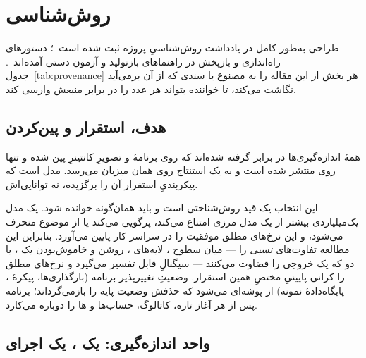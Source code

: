 \section{روش‌شناسی}
\label{sec:methodology}

طراحی به‌طور کامل در یادداشت روش‌شناسیِ پروژه ثبت شده
است~\cite{pwnzzdocsmeth}؛ دستورهای راه‌اندازی و بازپخش در راهنماهای
بازتولید و آزمون دستی
آمده‌اند~\cite{pwnzzdocsrepro,pwnzzdocsmanual}. جدول~\ref{tab:provenance}
هر بخش از این مقاله را به مصنوع یا سندی که از آن برمی‌آید نگاشت می‌کند، تا
خواننده بتواند هر عدد را در برابر منبعش وارسی کند.

\subsection{هدف، استقرار و پین‌کردن}
\label{sec:method:target}

همهٔ اندازه‌گیری‌ها در برابر  گرفته شده‌اند که روی
 برنامهٔ  و  تصویرِ کانتینرِ
 پین شده و تنها روی
 منتشر شده است و به یک 
استنتاج روی همان میزبان می‌رسد. مدل  است که پیکربندیِ
استقرار آن را برگزیده، نه توانایی‌اش.

این انتخاب یک قید روش‌شناختی است و باید همان‌گونه خوانده شود. یک مدل
یک‌میلیاردی بیشتر از یک مدل مرزی امتناع می‌کند، پرگویی می‌کند یا از موضوع
منحرف می‌شود، و این نرخ‌های مطلق موفقیت را در سراسر کار پایین می‌آورد.
بنابراین این مطالعه تفاوت‌های \emph{نسبی} را --- میان سطوح
، لایه‌های ، روشن و خاموش‌بودن یک
، یا دو  که یک خروجی را قضاوت می‌کنند ---
سیگنالِ قابل تفسیر می‌گیرد و نرخ‌های مطلق را کرانی پایینیِ مختصِ همین
استقرار. وضعیتِ تغییرپذیر برنامه (بارگذاری‌ها، پیکرهٔ ، پایگاه‌دادهٔ
نمونه) از پوشه‌ای  می‌شود که حذفش وضعیت پایه را بازمی‌گرداند؛
برنامه پس از هر آغاز تازه، کاتالوگ، حساب‌ها و ‌ها را
دوباره می‌کارد.

\subsection{واحد اندازه‌گیری: یک ، یک اجرای }
\label{sec:method:task}

